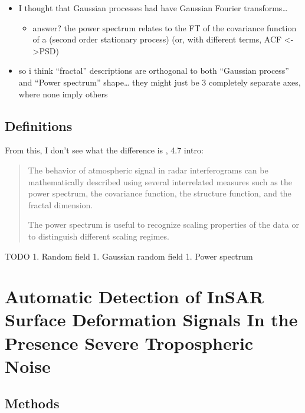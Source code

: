\documentclass{utexasthesis}
\begin{document}
\begin{itemize}

\item
  I thought that Gaussian processes had have Gaussian Fourier
  transforms\ldots{}

  \begin{itemize}
  
  \item
    answer? the power spectrum relates to the FT of the covariance
    function of a (second order stationary process) (or, with different
    terms, ACF <->PSD)
  \end{itemize}
\item
  so i think ``fractal'' descriptions are orthogonal to both ``Gaussian
  process'' and ``Power spectrum'' shape\ldots{} they might just be 3
  completely separate axes, where none imply others
\end{itemize}

\hypertarget{definitions}{%
\section{Definitions}\label{definitions}}

From \cite{Hanssen2001} this, I don't see \citet{Hanssen2001} what the difference is \citep{Hanssen2001} , 4.7 intro: 

\begin{quote}
    
The behavior of atmospheric signal in radar interferograms can be mathematically described using several interrelated measures such as the power spectrum, the covariance function, the structure function, and the fractal dimension.

The power spectrum is useful to recognize scaling properties of the data or to distinguish different scaling regimes.
\end{quote}

TODO 1. Random field 1. Gaussian random field 1. Power spectrum




\chapter{Automatic Detection of InSAR Surface Deformation Signals In the Presence Severe Tropospheric Noise}


\section{Methods}
\label{sec:methods}
\end{document}
